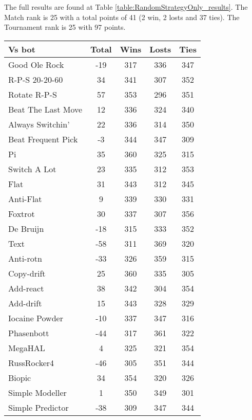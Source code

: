 The full results are found at Table \ref{table:RandomStrategyOnly_results}. The Match rank is 25 with a total points of 41 (2 win, 2 losts and 37 ties). The Tournament rank is 25 with 97 points.

\begin{table*}
    \caption{Random Strategy results}
    \label{table:RandomStrategyOnly_results}
    \centering
    \begin{tabular}{|l|c|c|c|c|}
        \hline
        \textbf{Vs bot} & \textbf{Total} & \textbf{Wins} & \textbf{Losts} & \textbf{Ties} \\ \hline
Good Ole Rock & -19 & 317 & 336 & 347 \\ \hline 
R-P-S 20-20-60 & 34 & 341 & 307 & 352 \\ \hline 
Rotate R-P-S & 57 & 353 & 296 & 351 \\ \hline 
Beat The Last Move & 12 & 336 & 324 & 340 \\ \hline 
Always Switchin' & 22 & 336 & 314 & 350 \\ \hline 
Beat Frequent Pick & -3 & 344 & 347 & 309 \\ \hline 
Pi & 35 & 360 & 325 & 315 \\ \hline 
Switch A Lot & 23 & 335 & 312 & 353 \\ \hline 
Flat & 31 & 343 & 312 & 345 \\ \hline 
Anti-Flat & 9 & 339 & 330 & 331 \\ \hline 
Foxtrot & 30 & 337 & 307 & 356 \\ \hline 
De Bruijn & -18 & 315 & 333 & 352 \\ \hline 
Text & -58 & 311 & 369 & 320 \\ \hline 
Anti-rotn & -33 & 326 & 359 & 315 \\ \hline 
Copy-drift & 25 & 360 & 335 & 305 \\ \hline 
Add-react & 38 & 342 & 304 & 354 \\ \hline 
Add-drift & 15 & 343 & 328 & 329 \\ \hline 
Iocaine Powder & -10 & 337 & 347 & 316 \\ \hline 
Phasenbott & -44 & 317 & 361 & 322 \\ \hline 
MegaHAL & 4 & 325 & 321 & 354 \\ \hline 
RussRocker4 & -46 & 305 & 351 & 344 \\ \hline 
Biopic & 34 & 354 & 320 & 326 \\ \hline 
Simple Modeller & 1 & 350 & 349 & 301 \\ \hline 
Simple Predictor & -38 & 309 & 347 & 344 \\ \hline 

\end{tabular}
\end{table*}
